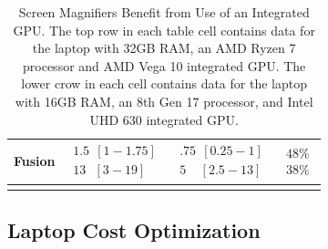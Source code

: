 \begin{longtable}[]{
 >{\raggedright\arraybackslash}m{}
 >{\raggedright\arraybackslash}m{}
 >{\raggedright\arraybackslash}m{}
 >{\raggedright\arraybackslash}m{}
 }
 Fusion & $\begin{array}{l}1.5~~[1-1.75] \\13~~~[3-19]\end{array}$ & $\begin{array}{l}.75~~[0.25-1] \\5~~~~~[2.5-13]\end{array}$ & $\begin{array}{l} 48\% \\ 38\%\end{array}$ \\[1.0em]\hline
 \caption[Screen Magnifiers Benefit from Integrated GPU]{Screen Magnifiers Benefit from Use of an Integrated GPU. The top row in each table cell contains data for the laptop with 32GB RAM, an AMD Ryzen 7 processor and AMD Vega 10 integrated GPU. The lower crow in each cell contains data for the laptop with 16GB RAM, an 8th Gen 17 processor, and Intel UHD 630 integrated GPU.} \label{tab:table51}
 \end{longtable}\clearpage
 
 \pagebreak \hypertarget{optimizing-cost-with-performance}{}\subsection{Laptop Cost Optimization}\label{optimizing-cost-with-performance}
 
